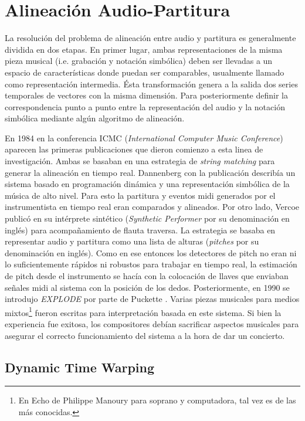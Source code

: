 \documentclass
  [ams,pdfout]%
	{aeslac}
\begin{document}
\section{Alineación Audio-Partitura}

La resolución del problema de alineación entre audio y partitura es generalmente dividida en dos etapas. En primer lugar, ambas representaciones de la misma pieza musical (i.e. grabación y notación simbólica) deben ser llevadas a un espacio de características donde puedan ser comparables, usualmente llamado como representación intermedia. Ésta transformación genera a la salida dos series temporales de vectores con la misma dimensión. Para posteriormente definir la correspondencia punto a punto entre la representación del audio y la notación simbólica mediante algún algoritmo de alineación.


En 1984 en la conferencia ICMC (\textit{International Computer Music Conference}) aparecen las primeras publicaciones que dieron comienzo a esta linea de investigación. Ambas se basaban en una estrategia de \textit{string matching} para generar la alineación en tiempo real. Dannenberg con la publicación \cite{dannenberg1984line} describía un sistema basado en programación dinámica y una representación simbólica de la música de alto nivel. Para esto la partitura y eventos midi generados por el instrumentista en tiempo real eran comparados y alineados. Por otro lado, Vercoe publicó en \cite{vercoe1984synthetic} su intérprete sintético (\textit{Synthetic Performer} por su denominación en inglés) para acompañamiento de flauta traversa. La estrategia se basaba en representar audio y partitura como una lista de alturas (\textit{pitches} por su denominación en inglés). Como en ese entonces los detectores de pitch no eran ni lo suficientemente rápidos ni robustos para trabajar en tiempo real, la estimación de pitch desde el instrumento se hacía con la colocación de llaves que enviaban señales midi al sistema con la posición de los dedos. Posteriormente, en 1990 se introdujo \textit{EXPLODE} por parte de Puckette \cite{puckette1990explode}. Varias piezas musicales para medios mixtos\footnote{En Echo de Philippe Manoury para soprano y computadora, tal vez es de las más conocidas.} fueron escritas para interpretación basada en este sistema. Si bien la experiencia fue exitosa, los compositores debían sacrificar aspectos musicales para asegurar el correcto funcionamiento del sistema a la hora de dar un concierto. 

\subsection{Dynamic Time Warping}
\end{document}
